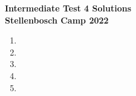 \documentclass{article}
\begin{document}
\thispagestyle{empty}

\begin{center} \bfseries
  \Large Intermediate Test 4 Solutions
  \\ \vspace{12pt}
  \large Stellenbosch Camp 2022
\end{center}

\bigskip \bigskip

\begin{enumerate}[itemsep=24pt]

\item %


\item


\item 


\item 


\item


\end{enumerate}
\end{document}
